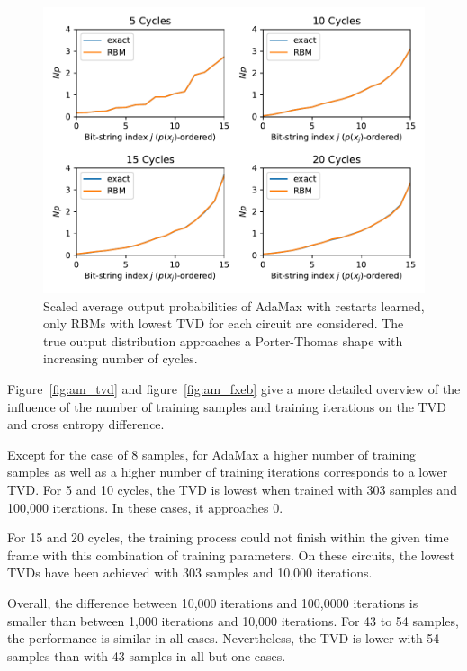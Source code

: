 \begin{figure}[H]
  \centering
  \includegraphics[width=\textwidth]{figures/results/AM-restarts-learned/avgBestPDF.pdf}
  \caption[Scaled Average Output Probabilities of Best Performing RBMs Trained with AdaMax with Random Restarts and $CZ$ Gates Learned]{
    Scaled average output probabilities of AdaMax with restarts learned, only RBMs with lowest
    TVD for each circuit are considered. The true 
    output distribution approaches a Porter-Thomas shape with increasing number of cycles.}
  \label{fig:am_avgBestPDF}
\end{figure}

Figure~\ref{fig:am_tvd} and figure~\ref{fig:am_fxeb} give a more detailed overview of the influence of the 
number of training samples and training iterations on the TVD and cross entropy difference.

Except for the case of 8 samples, for AdaMax a higher number of training samples as well as a higher 
number of training iterations corresponds to a lower TVD. For 5 and 10 cycles, the TVD is lowest
when trained with 303 samples and 100,000 iterations. In these cases, it approaches 0.

For 15 and 20 cycles, the training process could not finish
within the given time frame with this combination of training parameters. On these circuits, the lowest TVDs have been achieved with 303 samples 
and 10,000 iterations.

Overall, the difference between 10,000 iterations and 100,0000 iterations is smaller than between 
1,000 iterations and 10,000 iterations. For 43 to 54 samples, the performance is similar in all cases.
Nevertheless, the TVD is lower with 54 samples than with 43 samples in all but one cases.

